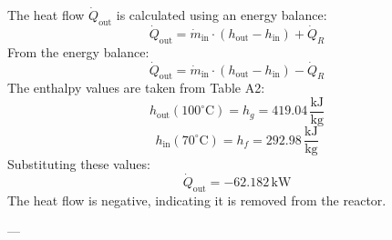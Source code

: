 The heat flow \( \dot{Q}_{\text{out}} \) is calculated using an energy balance:  
\[
\dot{Q}_{\text{out}} = \dot{m}_{\text{in}} \cdot (h_{\text{out}} - h_{\text{in}}) + \dot{Q}_R
\]  
From the energy balance:  
\[
\dot{Q}_{\text{out}} = \dot{m}_{\text{in}} \cdot (h_{\text{out}} - h_{\text{in}}) - \dot{Q}_R
\]  
The enthalpy values are taken from Table A2:  
\[
h_{\text{out}} (100^\circ\text{C}) = h_g = 419.04 \, \frac{\text{kJ}}{\text{kg}}
\]  
\[
h_{\text{in}} (70^\circ\text{C}) = h_f = 292.98 \, \frac{\text{kJ}}{\text{kg}}
\]  
Substituting these values:  
\[
\dot{Q}_{\text{out}} = -62.182 \, \text{kW}
\]  
The heat flow is negative, indicating it is removed from the reactor.  

---